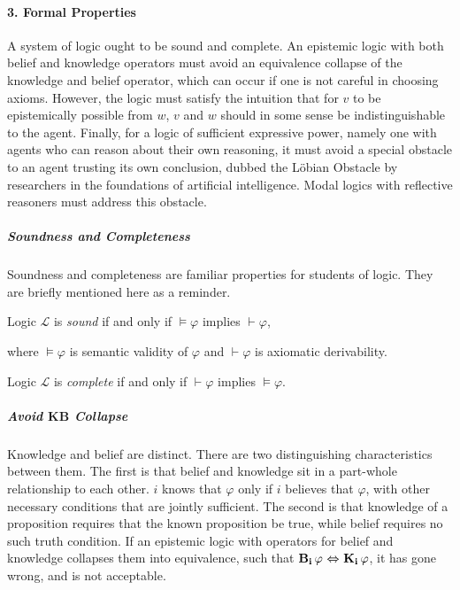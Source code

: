
\paragraph{3. Formal Properties}

A system of logic ought to be sound and complete. An epistemic logic with both belief and knowledge operators must avoid an equivalence collapse of the knowledge and belief operator, which can occur if one is not careful in choosing axioms. However, the logic must satisfy the intuition that for $v$ to be epistemically possible from $w$, $v$ and $w$ should in some sense be indistinguishable to the agent. Finally, for a logic of sufficient expressive power, namely one with agents who can reason about their own reasoning, it must avoid a special obstacle to an agent trusting its own conclusion, dubbed the L\"obian Obstacle by researchers in the foundations of artificial intelligence. Modal logics with reflective reasoners must address this obstacle. 

\subparagraph{Soundness and Completeness}
Soundness and completeness are familiar properties for students of logic. They are briefly mentioned here as a reminder.
\begin{definition}[Soundness]
	Logic $\mathcal{L}$ is \emph{sound} if and only if $\models\varphi$ implies $\vdash\varphi$,
\end{definition}
where $\models\varphi$ is semantic validity of $\varphi$ and $\vdash\varphi$ is axiomatic derivability.

\begin{definition}[Completeness]
	Logic $\mathcal{L}$ is \emph{complete} if and only if $\vdash\varphi$ implies $\models\varphi$.
\end{definition}

\subparagraph{Avoid $\mathbf{KB}$ Collapse}
Knowledge and belief are distinct. There are two distinguishing characteristics between them. The first is that belief and knowledge sit in a part-whole relationship to each other. $i$ knows that $\varphi$ only if $i$ believes that $\varphi$, with other necessary conditions that are jointly sufficient. The second is that knowledge of a proposition requires that the known proposition be true, while belief requires no such truth condition. If an epistemic logic with operators for belief and knowledge collapses them into equivalence, such that $\mathbf{B}_{\mathbf{i}}\,\varphi {\ \Leftrightarrow \ } \mathbf{K}_{\mathbf{i}}\,\varphi$, it has gone wrong, and is not acceptable.

